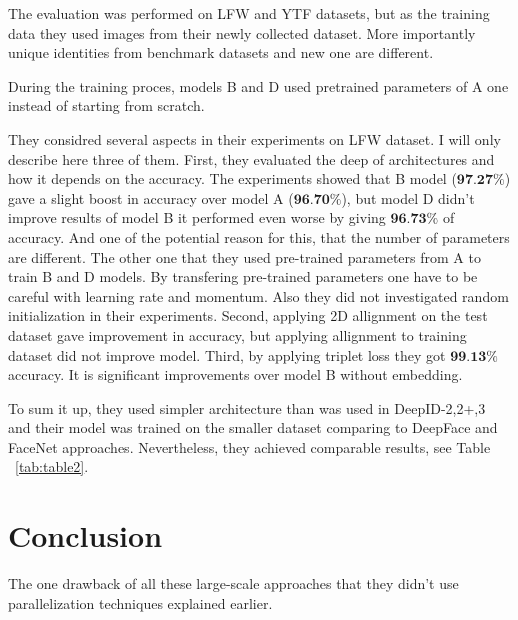 \documentclass[paper=a4, fontsize=11pt]{scrartcl} %
\numberwithin{equation}{section} %
\numberwithin{figure}{section} %
\numberwithin{table}{section} %
\begin{document}
The evaluation was performed on LFW and YTF datasets, but as the training data they used images from their newly collected dataset. More importantly unique identities from benchmark datasets and new one are different.\par
During the training proces, models B and D used pretrained parameters of A one instead of starting from scratch. \par
They considred several aspects in their experiments on LFW dataset. I will only describe here three of them. First, they evaluated the deep of architectures and how it depends on the accuracy. The experiments showed that B model ($\textbf{97.27}\%$) gave a slight boost in accuracy over model A ($\textbf{96.70}\%$), but model D didn't improve results of model B it performed even worse by giving $\textbf{96.73}\%$ of accuracy. And one of the potential reason for this, that the number of parameters are different. The other one that they used pre-trained parameters from A to train B and D models. By transfering pre-trained parameters one have to be careful with learning rate and momentum. Also they did not investigated random initialization in their experiments. Second, applying 2D allignment on the test dataset gave improvement in accuracy, but applying allignment to training dataset did not improve model. Third, by applying triplet loss they got $\textbf{99.13\%}$ accuracy. It is significant improvements over model B without embedding. \par
To sum it up, they used simpler architecture than was used in DeepID-2,2+,3 \cite{sun2014deep, sun2015deeply, sun2015deepid3} and their model was trained on the smaller dataset comparing to DeepFace and FaceNet approaches. Nevertheless, they achieved comparable results, see Table ~\ref{tab:table2}.
\newpage

\section{Conclusion}
The one drawback of all these large-scale approaches that they didn't use parallelization techniques explained earlier.

\newpage




\end{document}
